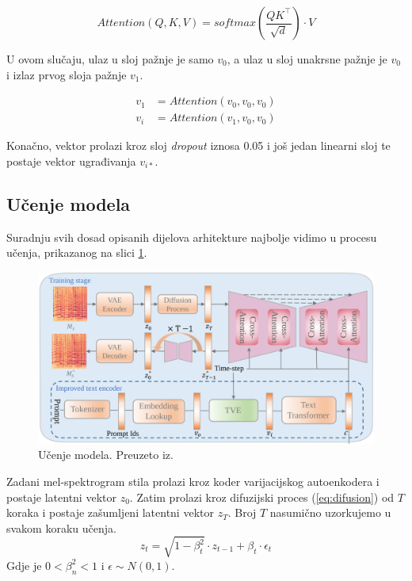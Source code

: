 \begin{equation}
    {Attention}(Q, K, V) = softmax(\frac{QK^\top}{\sqrt{d}})\cdot V
\end{equation}

U ovom slučaju, ulaz u sloj pažnje je samo $v_0$, a ulaz u sloj unakrsne pažnje je $v_0$ i izlaz prvog sloja pažnje $v_1$.

\begin{align}
    v_1  &= {Attention}(v_0, v_0, v_0) \\
    v_i &= {Attention}(v_1, v_0, v_0)
\end{align}

Konačno, vektor prolazi kroz sloj \textit{dropout} iznosa 0.05 i još jedan linearni sloj te postaje vektor ugrađivanja $v_{i*}$. 

\subsection{Učenje modela}
Suradnju svih dosad opisanih dijelova arhitekture najbolje vidimo u procesu učenja, prikazanog na slici \ref{fig:arhitektura_train}. 

\begin{figure}[H]
    \centering
    \includegraphics[width=0.9\linewidth]{imgs/train.png}
    \caption{Učenje modela. Preuzeto iz\cite{huang2024musicstyletransferdiffusion}.}
    \label{fig:arhitektura_train}
\end{figure}

Zadani mel-spektrogram stila prolazi kroz koder varijacijskog autoenkodera i postaje latentni vektor $z_0$. Zatim prolazi kroz difuzijski proces (\ref{eq:difusion}) od $T$ koraka i postaje zašumljeni latentni vektor $z_T$. Broj $T$  nasumično uzorkujemo u svakom koraku učenja.
\begin{equation}
    z_t = \sqrt{1 - \beta_t^2} \cdot z_{t-1} + \beta_t \cdot \epsilon_t
    \label{eq:difusion}
\end{equation}
Gdje je $0 < \beta_n^2 < 1$ i $\epsilon \sim N(0, 1)$.

